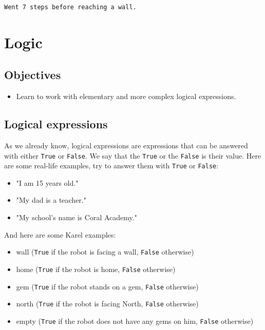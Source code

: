 \begin{verbatim}
Went 7 steps before reaching a wall.
\end{verbatim}


\section{Logic} \label{sec:logic}

\subsection{Objectives} 
 
\begin{itemize}
\item Learn to work with elementary and more complex logical expressions.
\end{itemize}

\subsection{Logical expressions}
As we already know, logical expressions are expressions that can be answered with either {\tt True} or 
{\tt False}. We say that the {\tt True} or the {\tt False} is their value. Here are some 
real-life examples, try to answer them with {\tt True} or {\tt False}:

\begin{itemize}
\item "I am 15 years old."
\item "My dad is a teacher."
\item "My school's name is Coral Academy."
\end{itemize}
And here are some Karel examples:
\begin{itemize}
\item wall ({\tt True} if the robot is facing a wall, {\tt False} otherwise)
\item home ({\tt True} if the robot is home, {\tt False} otherwise)
\item gem ({\tt True} if the robot stands on a gem, {\tt False} otherwise)
\item north ({\tt True} if the robot is facing North, {\tt False} otherwise)
\item empty ({\tt True} if the robot does not have any gems on him, {\tt False} otherwise)
\end{itemize}

